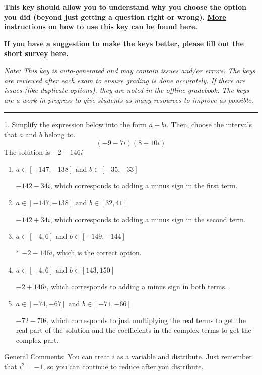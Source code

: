 \documentclass{extbook}[14pt]
\begin{document}
\textbf{This key should allow you to understand why you choose the option you did (beyond just getting a question right or wrong). \href{https://xronos.clas.ufl.edu/mac1105spring2020/courseDescriptionAndMisc/Exams/LearningFromResults}{More instructions on how to use this key can be found here}.}

\textbf{If you have a suggestion to make the keys better, \href{https://forms.gle/CZkbZmPbC9XALEE88}{please fill out the short survey here}.}

\textit{Note: This key is auto-generated and may contain issues and/or errors. The keys are reviewed after each exam to ensure grading is done accurately. If there are issues (like duplicate options), they are noted in the offline gradebook. The keys are a work-in-progress to give students as many resources to improve as possible.}

\rule{\textwidth}{0.4pt}

1. Simplify the expression below into the form $a+bi$. Then, choose the intervals that $a$ and $b$ belong to.
\[ (-9  - 7 i)(8  + 10 i) \] 
The solution is $ -2  - 146 i $ 

\begin{enumerate}[label=\Alph*.] 
\item $ a \in [-147, -138] \text{ and } b \in [-35, -33] $ 

  $-142  - 34 i$, which corresponds to adding a minus sign in the first term. 
\item $ a \in [-147, -138] \text{ and } b \in [32, 41] $ 

  $-142  + 34 i$, which corresponds to adding a minus sign in the second term. 
\item $ a \in [-4, 6] \text{ and } b \in [-149, -144] $ 

 * $-2  - 146 i$, which is the correct option. 
\item $ a \in [-4, 6] \text{ and } b \in [143, 150] $ 

  $-2  + 146 i$, which corresponds to adding a minus sign in both terms. 
\item $ a \in [-74, -67] \text{ and } b \in [-71, -66] $ 

  $-72  - 70 i$, which corresponds to just multiplying the real terms to get the real part of the solution and the coefficients in the complex terms to get the complex part. 
\end{enumerate} 
 
General Comments: You can treat $i$ as a variable and distribute. Just remember that $i^2=-1$, so you can continue to reduce after you distribute.
\end{document}
